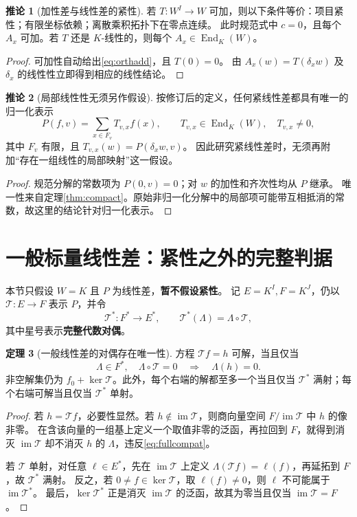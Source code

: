 \documentclass[UTF8,11pt,a4paper]{ctexart}
\theoremstyle{definition}
\newtheorem{theorem}{定理}[section]
\newtheorem{corollary}[theorem]{推论}
\newcommand{\End}{\operatorname{End}}
\newcommand{\im}{\operatorname{im}}
\newcommand{\T}{\mathcal T}
\numberwithin{equation}{section}
\begin{document}
\begin{corollary}[加性差与线性差的紧性]\label{cor:lincompact}
若 $T:W^I\to W$ 可加，则以下条件等价：项目紧性；有限坐标依赖；离散乘积拓扑下在零点连续。
此时规范式中 $c=0$，且每个 $A_x$ 可加。若 $T$ 还是 $K$-线性的，则每个 $A_x\in\End_K(W)$。
\end{corollary}
\begin{proof}
可加性自动给出\eqref{eq:orthadd}，且 $T(0)=0$。
由 $A_x(w)=T(\delta_xw)$ 及 $\delta_x$ 的线性性立即得到相应的线性结论。
\end{proof}

\begin{corollary}[局部线性性无须另作假设]\label{cor:autolocal}
按修订后的定义，任何紧线性差都具有唯一的归一化表示
\[
 P(f,v)=\sum_{x\in F_v}T_{v,x}f(x),\qquad
 T_{v,x}\in\End_K(W),\quad T_{v,x}\ne0,
\]
其中 $F_v$ 有限，且 $T_{v,x}(w)=P(\delta_xw,v)$。
因此研究紧线性差时，无须再附加“存在一组线性的局部映射”这一假设。
\end{corollary}
\begin{proof}
规范分解的常数项为 $P(0,v)=0$；对 $w$ 的加性和齐次性均从 $P$ 继承。
唯一性来自定理\ref{thm:compact}。原始非归一化分解中的局部项可能带互相抵消的常数，故这里的结论针对归一化表示。
\end{proof}

\section{一般标量线性差：紧性之外的完整判据}\label{sec:noncompact}
本节只假设 $W=K$ 且 $P$ 为线性差，\textbf{暂不假设紧性}。
记 $E=K^I,F=K^J$，仍以 $\T:E\to F$ 表示 $P$，并令
\[
 \T^*:F^*\to E^*,\qquad \T^*(\Lambda)=\Lambda\circ\T,
\]
其中星号表示\textbf{完整代数对偶}。

\begin{theorem}[一般线性差的对偶存在唯一性]\label{thm:fullalgebraic}
方程 $\T f=h$ 可解，当且仅当
\begin{equation}\label{eq:fullcompat}
 \Lambda\in F^*,\quad \Lambda\circ\T=0
 \quad\Longrightarrow\quad \Lambda(h)=0.
\end{equation}
非空解集仍为 $f_0+\ker\T$。此外，每个右端的解都至多一个当且仅当 $\T^*$ 满射；每个右端可解当且仅当 $\T^*$ 单射。
\end{theorem}
\begin{proof}
若 $h=\T f$，必要性显然。若 $h\notin\im\T$，则商向量空间 $F/\im\T$ 中 $h$ 的像非零。
在含该向量的一组基上定义一个取值非零的泛函，再拉回到 $F$，就得到消灭 $\im\T$ 却不消灭 $h$ 的 $\Lambda$，违反\eqref{eq:fullcompat}。

若 $\T$ 单射，对任意 $\ell\in E^*$，先在 $\im\T$ 上定义 $\Lambda(\T f)=\ell(f)$，再延拓到 $F$，故 $\T^*$ 满射。
反之，若 $0\ne f\in\ker\T$，取 $\ell(f)\ne0$，则 $\ell$ 不可能属于 $\im\T^*$。
最后，$\ker\T^*$ 正是消灭 $\im\T$ 的泛函，故其为零当且仅当 $\im\T=F$。
\end{proof}
\end{document}

